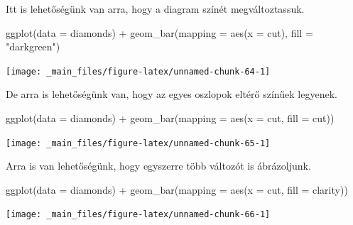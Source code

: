 \documentclass[
]{book}
\newenvironment{Shaded}{\begin{snugshade}}{\end{snugshade}}
\newcommand{\AttributeTok}[1]{\textcolor[rgb]{0.77,0.63,0.00}{#1}}
\newcommand{\FunctionTok}[1]{\textcolor[rgb]{0.00,0.00,0.00}{#1}}
\newcommand{\NormalTok}[1]{#1}
\newcommand{\SpecialCharTok}[1]{\textcolor[rgb]{0.00,0.00,0.00}{#1}}
\newcommand{\StringTok}[1]{\textcolor[rgb]{0.31,0.60,0.02}{#1}}
\begin{document}
Itt is lehetőségünk van arra, hogy a diagram színét megváltoztassuk.

\begin{Shaded}
\begin{Highlighting}[]
\FunctionTok{ggplot}\NormalTok{(}\AttributeTok{data =}\NormalTok{ diamonds) }\SpecialCharTok{+}
  \FunctionTok{geom\_bar}\NormalTok{(}\AttributeTok{mapping =} \FunctionTok{aes}\NormalTok{(}\AttributeTok{x =}\NormalTok{ cut), }\AttributeTok{fill =} \StringTok{"darkgreen"}\NormalTok{)}
\end{Highlighting}
\end{Shaded}

\begin{center}\texttt{[image: \_main\_files/figure-latex/unnamed-chunk-64-1]} \end{center}

De arra is lehetőségünk van, hogy az egyes oszlopok eltérő színűek
legyenek.

\begin{Shaded}
\begin{Highlighting}[]
\FunctionTok{ggplot}\NormalTok{(}\AttributeTok{data =}\NormalTok{ diamonds) }\SpecialCharTok{+}
  \FunctionTok{geom\_bar}\NormalTok{(}\AttributeTok{mapping =} \FunctionTok{aes}\NormalTok{(}\AttributeTok{x =}\NormalTok{ cut, }\AttributeTok{fill =}\NormalTok{ cut))}
\end{Highlighting}
\end{Shaded}

\begin{center}\texttt{[image: \_main\_files/figure-latex/unnamed-chunk-65-1]} \end{center}

Arra is van lehetőségünk, hogy egyszerre több változót is ábrázoljunk.

\begin{Shaded}
\begin{Highlighting}[]
\FunctionTok{ggplot}\NormalTok{(}\AttributeTok{data =}\NormalTok{ diamonds) }\SpecialCharTok{+}
  \FunctionTok{geom\_bar}\NormalTok{(}\AttributeTok{mapping =} \FunctionTok{aes}\NormalTok{(}\AttributeTok{x =}\NormalTok{ cut, }\AttributeTok{fill =}\NormalTok{ clarity))}
\end{Highlighting}
\end{Shaded}

\begin{center}\texttt{[image: \_main\_files/figure-latex/unnamed-chunk-66-1]} \end{center}
\end{document}
